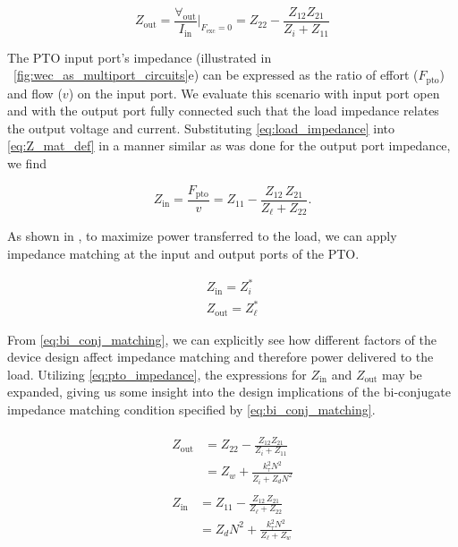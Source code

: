 \documentclass[lettersize,journal]{IEEEtran}
\begin{document}
\begin{equation}
        Z_{\textrm{out}} = \frac{\forall_{\textrm{out}}}{I_{\textrm{in}}} \bigg\vert_{F_{\textrm{exc}}=0} = Z_{22} - \frac{Z_{12} Z_{21}}{Z_{i} + Z_{11}}
        \label{eq:pto_output_port_impedance}
\end{equation}

The PTO input port's impedance (illustrated in \figurename~\ref{fig:wec_as_multiport_circuits}e) can be expressed as the ratio of effort ($F_{\textrm{pto}}$) and flow ($v$) on the input port.
We evaluate this scenario with input port open and with the output port fully connected such that the load impedance relates the output voltage and current.
Substituting \eqref{eq:load_impedance} into \eqref{eq:Z_mat_def} in a manner similar as was done for the output port impedance, we find

\begin{equation}
        Z_{\textrm{in}} = \frac{F_{\textrm{pto}}}{v}=  Z_{11} - \frac{Z_{12} \, Z_{21}}{Z_\ell + Z_{22}} .
        \label{eq:pto_input_port_impedance}
\end{equation}

As shown in  \cite{Bacelli:2021aa}, to maximize power transferred to the load, we can apply impedance matching at the input and output ports of the PTO.

\begin{subequations}
    \begin{align}
        Z_{\textrm{in}} = Z_i^*  \label{eq:bi_conj_matching_in} \\ 
        Z_{\textrm{out}} = Z_\ell^* \label{eq:bi_conj_matching_out}
    \end{align}
\label{eq:bi_conj_matching}
\end{subequations}

\noindent{}From \eqref{eq:bi_conj_matching}, we can explicitly see how different factors of the device design affect impedance matching and therefore power delivered to the load.
Utilizing \eqref{eq:pto_impedance}, the expressions for $Z_{\textrm{in}}$ and $Z_{\textrm{out}}$ may be expanded, giving us some insight into the design implications of the bi-conjugate impedance matching condition specified by \eqref{eq:bi_conj_matching}.

\begin{subequations}
\begin{align}
        \begin{split}
                Z_{\textrm{out}} &=  Z_{22} - \frac{Z_{12} Z_{21}}{Z_{i} + Z_{11}} \\[0.5em]
                &=  Z_w + \frac{k_\tau^2 N^2}{Z_i + Z_d N^2}
        \end{split}\label{eq:expanded_zin} \\[1em]
        \begin{split}
                Z_{\textrm{in}} &= Z_{11} - \frac{Z_{12} \, Z_{21}}{Z_\ell + Z_{22}} \\[0.5em]
                &= Z_d N^2 + \frac{k_\tau^2 N^2}{Z_\ell + Z_w}
        \end{split}\label{eq:expanded_zout}
\end{align}\label{eq:expanded_z}
\end{subequations}
\end{document}

